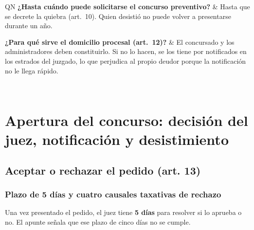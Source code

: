 \documentclass[12pt,oneside]{book}
\begin{document}
\begin{longtable}{QN}
\textbf{¿Hasta cuándo puede solicitarse el concurso preventivo?} &
Hasta que se decrete la quiebra (art.~10). Quien desistió no puede volver a presentarse durante un año. \\
\addlinespace[0.6em]

\textbf{¿Para qué sirve el domicilio procesal (art.~12)?} &
El concursado y los administradores deben constituirlo. Si no lo hacen, se los tiene por notificados en los estrados del juzgado, lo que perjudica al propio deudor porque la notificación no le llega rápido. \\
\midrule

 \\
\bottomrule
\end{longtable}

\chapter[Decisión, notificación y desistimiento]{Apertura del concurso: decisión del juez, notificación y desistimiento}

\section{Aceptar o rechazar el pedido (art. 13)}

\subsection{Plazo de 5 días y cuatro causales taxativas de rechazo}

Una vez presentado el pedido, el juez tiene \textbf{5 días} para resolver si lo aprueba o no. %
El apunte señala que ese plazo de cinco días no se cumple.
\end{document}

